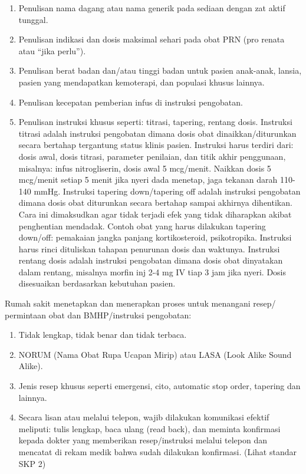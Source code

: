 \documentclass[
]{book}
\providecommand{\tightlist}{%
  \setlength{\itemsep}{0pt}\setlength{\parskip}{0pt}}
\begin{document}
\begin{enumerate}
\def\labelenumi{\alph{enumi}.}
\tightlist
\item
  Penulisan nama dagang atau nama generik pada sediaan dengan zat aktif tunggal.
\item
  Penulisan indikasi dan dosis maksimal sehari pada obat PRN (pro renata atau ``jika perlu'').
\item
  Penulisan berat badan dan/atau tinggi badan untuk pasien anak-anak, lansia, pasien yang mendapatkan kemoterapi, dan populasi khusus lainnya.
\item
  Penulisan kecepatan pemberian infus di instruksi pengobatan.
\item
  Penulisan instruksi khusus seperti: titrasi, tapering, rentang dosis.
  Instruksi titrasi adalah instruksi pengobatan dimana dosis obat dinaikkan/diturunkan secara bertahap tergantung status klinis pasien. Instruksi harus terdiri dari: dosis awal, dosis titrasi, parameter penilaian, dan titik akhir penggunaan, misalnya: infus nitrogliserin, dosis awal 5 mcg/menit. Naikkan dosis 5 mcg/menit setiap 5 menit jika nyeri dada menetap, jaga tekanan darah 110-140 mmHg.
  Instruksi tapering down/tapering off adalah instruksi pengobatan dimana dosis obat diturunkan secara bertahap sampai akhirnya dihentikan. Cara ini dimaksudkan agar tidak terjadi efek yang tidak diharapkan akibat penghentian mendadak. Contoh obat yang harus dilakukan tapering down/off: pemakaian jangka panjang kortikosteroid, psikotropika. Instruksi harus rinci dituliskan tahapan penurunan dosis dan waktunya.
  Instruksi rentang dosis adalah instruksi pengobatan dimana dosis obat dinyatakan dalam rentang, misalnya morfin inj 2-4 mg IV tiap 3 jam jika nyeri. Dosis disesuaikan berdasarkan kebutuhan pasien.
\end{enumerate}

Rumah sakit menetapkan dan menerapkan proses untuk menangani resep/ permintaan obat dan BMHP/instruksi pengobatan:

\begin{enumerate}
\def\labelenumi{\alph{enumi}.}
\tightlist
\item
  Tidak lengkap, tidak benar dan tidak terbaca.
\item
  NORUM (Nama Obat Rupa Ucapan Mirip) atau LASA (Look Alike Sound Alike).
\item
  Jenis resep khusus seperti emergensi, cito, automatic stop order, tapering dan lainnya.
\item
  Secara lisan atau melalui telepon, wajib dilakukan komunikasi efektif meliputi: tulis lengkap, baca ulang (read back), dan meminta konfirmasi kepada dokter yang memberikan resep/instruksi melalui telepon dan mencatat di rekam medik bahwa sudah dilakukan konfirmasi. (Lihat standar SKP 2)
\end{enumerate}
\end{document}
